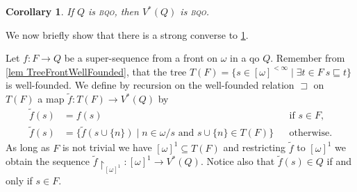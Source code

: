 \documentclass{article}%
\theoremstyle{plain}
\newtheorem{corollary}[theorem]{Corollary}
\theoremstyle{definition}
\theoremstyle{remark}
\newcommand{\bqo}{\textsc{bqo}}
\newcommand{\PowerQ}{V^{*}}
\newcommand{\restr}[1]{\mathord{\upharpoonright_{#1}}} %
\newcommand{\segm} {\sqsubseteq}
\newcommand{\sges} {\sqsupset}
\newcommand{\finSub}[1] {[#1]^{<\infty}}
\begin{document}
\begin{corollary}\label{cor PowerQPresBqo}
If $Q$ is \bqo{}, then $\PowerQ(Q)$ is \bqo{}.
\end{corollary}


We now briefly show that there is a strong converse to \cref{cor PowerQPresBqo}.

Let $f:F\to Q$ be a super-sequence from a front on $\omega$ in a qo $Q$. Remember from \cref{lem TreeFrontWellFounded}, that the tree $T(F)=\{s\in \finSub{\omega}\mid \exists t\in F \ s\segm t\}$ is well-founded. We define by recursion on the well-founded relation $\sges$ on $T(F)$ a map $\tilde{f}:T(F)\to \PowerQ(Q)$ by
\begin{align*}
\tilde{f}(s)&=f(s) &&\text{if $s\in F$,}\\
\tilde{f}(s)&=\big\{\tilde{f}(s\cup \{n\})\mid n\in\omega/s \text{ and } s\cup\{n\}\in  T(F)\big\} &&\text{otherwise.}
\end{align*}
As long as $F$ is not trivial we have $[\omega]^{1}\subseteq T(F)$ and restricting $\tilde{f}$ to $[\omega]^{1}$ we obtain the sequence $\tilde{f}\restr{[\omega]^{1}}:[\omega]^{1}\to \PowerQ(Q)$. Notice also that $\tilde{f}(s)\in Q$ if and only if $s\in F$. 
\end{document}
